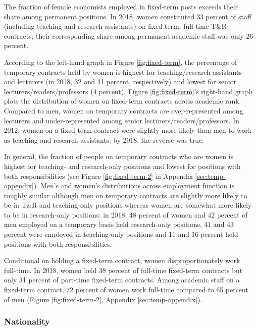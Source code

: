 \documentclass[a4paper, 1]{article}
\begin{document}
The fraction of female economists employed in fixed-term posts exceeds their share among permanent positions. In 2018, women constituted 33 percent of staff (including teaching and research assistants) on fixed-term, full-time T\&R contracts; their corresponding share among permanent academic staff was only 26 percent.

According to the left-hand graph in Figure \ref{fig:fixed-term}, the percentage of temporary contracts held by women is highest for teaching/research assistants and lecturers (in 2018, 32 and 41 percent, respectively) and lowest for senior lecturers/readers/professors (4 percent). Figure \ref{fig:fixed-term}'s right-hand graph plots the distribution of women on fixed-term contracts across academic rank. Compared to men, women on temporary contracts are over-represented among lecturers and under-represented among senior lecturers/readers/professors. In 2012, women on a fixed term contract were slightly more likely than men to work as teaching and research assistants; by 2018, the reverse was true.

In general, the fraction of people on temporary contracts who are women is highest for teaching- and research-only positions and lowest for positions with both responsibilities (see Figure \ref{fig:fixed-term-2} in Appendix \ref{sec:temp-appendix}). Men's and women's distributions across employment function is roughly similar although men on temporary contracts are slightly more likely to be in T\&R and teaching-only positions whereas women are somewhat more likely to be in research-only positions: in 2018, 48 percent of women and 42 percent of men employed on a temporary basis held research-only positions, 41 and 43 percent were employed in teaching-only positions and 11 and 16 percent held positions with both responsibilities.

Conditional on holding a fixed-term contract, women disproportionately work full-time. In 2018, women held 38 percent of full-time fixed-term contracts but only 31 percent of part-time fixed-term contracts. Among academic staff on a fixed-term contract, 72 percent of women work full-time compared to 65 percent of men (Figure \ref{fig:fixed-term-2}, Appendix \ref{sec:temp-appendix}).

\hypertarget{nationality}{%
\subsubsection{Nationality}\label{nationality}}
\end{document}
